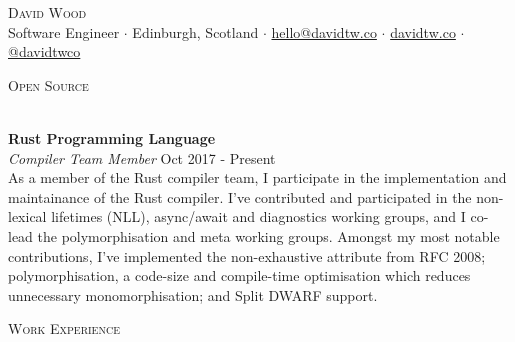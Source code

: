 \documentclass[a4paper]{article}
\newcommand{\lineunder} {
  \vspace*{-8pt} \\
  \hspace*{-18pt} \hrulefill \\
}
\newcommand{\header} [1] {
  {\hspace*{-18pt}\vspace*{6pt} \textsc{#1}}
  \vspace*{-6pt} \lineunder
}
\begin{document}
\fancyhead{}
\renewcommand{\headrulewidth}{0pt}

\fancyfoot{}
\fancyfoot[R]{\scriptsize\scshape\color{gray} \thepage}

\vspace*{-40pt}

\vspace*{-10pt}
\begin{center}
  {\Huge \scshape {David Wood}} \\
  \vspace{1mm}
  Software Engineer $\cdot$
  Edinburgh, Scotland $\cdot$
  \href{mailto:hello@davidtw.co}{hello@davidtw.co} $\cdot$
  \href{https://davidtw.co}{davidtw.co} $\cdot$
  \href{https://github.com/davidtwco}{@davidtwco} \\
\end{center}

\header{Open Source}
\vspace{1mm}

\textbf{Rust Programming Language} \\
\textit{Compiler Team Member} \hfill {\color{gray} Oct 2017 - Present} \\
\vspace{2mm}
As a member of the Rust compiler team, I participate in the implementation and maintainance of the
Rust compiler. I've contributed and participated in the non-lexical lifetimes (NLL), async/await
and diagnostics working groups, and I co-lead the polymorphisation and meta working groups. Amongst
my most notable contributions, I've implemented the non-exhaustive attribute from RFC 2008;
polymorphisation, a code-size and compile-time optimisation which reduces unnecessary
monomorphisation; and Split DWARF support.
\vspace{2mm}

\header{Work Experience}
\vspace{1mm}
\end{document}
